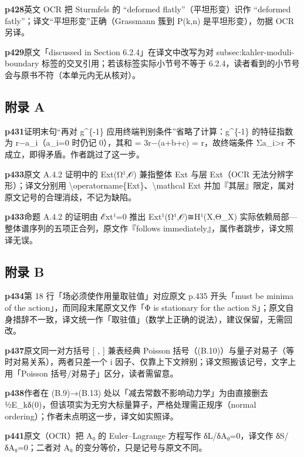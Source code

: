 \noindent\textbf{\footnotesize p428}\quad 英文 OCR 把 Sturmfels 的 “deformed flatly”（平坦形变）识作 “deformed fatly”；译文“平坦形变”正确（Grassmann 簇到 P(k,n) 是平坦形变），勿据 OCR 另译。

\noindent\textbf{\footnotesize p429}\quad 原文「discussed in Section 6.2.4」在译文中改写为对 subsec:kahler-moduli-boundary 标签的交叉引用；若该标签实际小节号不等于 6.2.4，读者看到的小节号会与原书不符（本单元内无从核对）。


\subsection*{附录 A}

\noindent\textbf{\footnotesize p431}\quad 证明末句“再对 g\^{}\{-1\} 应用终端判别条件”省略了计算：g\^{}\{-1\} 的特征指数为 r−a\_i（a\_i=0 时仍记 0），其和 = 3r−(a+b+c) = r，故终端条件 Σa\_i>r 不成立，即得矛盾。作者跳过了这一步。

\noindent\textbf{\footnotesize p433}\quad 原文 A.4.2 证明中的 Ext(Ω¹,𝒪) 兼指整体 Ext 与层 Ext（OCR 无法分辨字形）；译文分别用 \textbackslash{}operatorname\{Ext\}、\textbackslash{}mathcal Ext 并加『其层』限定，属对原文记号的合理消歧，不记为缺陷。

\noindent\textbf{\footnotesize p433}\quad 命题 A.4.2 的证明由 ℰxt¹=0 推出 Ext¹(Ω¹,𝒪)≅H¹(X,Θ\_X) 实际依赖局部—整体谱序列的五项正合列，原文作『follows immediately』，属作者跳步，译文照译无误。


\subsection*{附录 B}

\noindent\textbf{\footnotesize p434}\quad 第 18 行「场必须使作用量取驻值」对应原文 p.435 开头「must be minima of the action」，而同段末尾原文又作「Φ is stationary for the action S」；原文自身措辞不一致，译文统一作「取驻值」（数学上正确的说法），建议保留，无需回改。

\noindent\textbf{\footnotesize p437}\quad 原文同一对方括号 [ , ] 兼表经典 Poisson 括号（(B.10)）与量子对易子（等时对易关系），两者只差一个 i 因子、仅靠上下文辨别；译文照搬该记号，文字上用「Poisson 括号/对易子」区分，读者需留意。

\noindent\textbf{\footnotesize p438}\quad 作者在 (B.9)→(B.13) 处以「减去常数不影响动力学」为由直接删去 ½E\_kδ(0)，但该项实为无穷大标量算子，严格处理需正规序（normal ordering）；作者未点明这一步，译文如实照译。

\noindent\textbf{\footnotesize p441}\quad 原文（OCR）把 A₀ 的 Euler–Lagrange 方程写作 δL/δA₀=0，译文作 δS/δA₀=0；二者对 A₀ 的变分等价，只是记号与原文不同。

